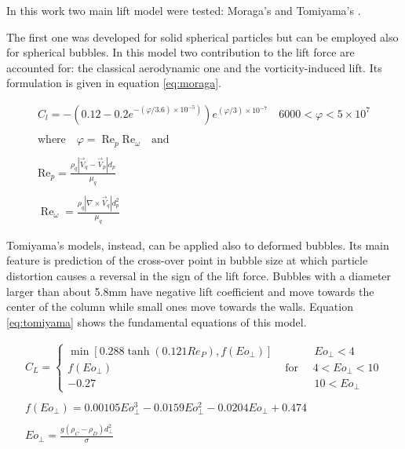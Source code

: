 \documentclass[11pt,a4paper]{article}
\begin{document}
In this work two main lift model were tested: Moraga's \cite{moragalift} and Tomiyama's \cite{tomiyamalift}.

The first one was developed for solid spherical particles but can be employed also for spherical bubbles. In this model two contribution to the lift force are accounted for: the classical aerodynamic one and the vorticity-induced lift. Its formulation is given in equation \ref{eq:moraga}.

\begin{equation}
\begin{array}{l}
C_{l}=-\left(0.12-0.2 e^{\left.-(\varphi / 3.6) \times 10^{-5}\right)}\right) e^{(\varphi / 3) \times 10^{-7}} \quad 6000<\varphi<5 \times 10^{7}\\ \\
\text{where} \quad \varphi=\operatorname{Re}_{p} \mathrm{Re}_{\omega} \quad \text{and}	\\ \\
\mathrm{Re}_{p}=\frac{\rho_{q}\left|\vec{V}_{q}-\vec{V}_{p}\right| d_{p}}{\mu_{q}} \\ \\
\operatorname{Re}_{\omega}=\frac{\rho_{q}\left|\nabla \times \vec{V}_{q}\right| d_{p}^{2}}{\mu_{q}}
\end{array}
\label{eq:moraga}	
\end{equation}

Tomiyama's models, instead, can be applied also to deformed bubbles. Its main feature is prediction of the cross-over point in bubble size at which particle distortion causes a reversal in the sign of the lift force. Bubbles with a diameter larger than about 5.8mm have negative lift coefficient and move towards the center of the column while small ones move towards the walls. Equation \ref{eq:tomiyama} shows the fundamental equations of this model.


\begin{equation}
\begin{array}{l}
C_{L}=\left\{\begin{array}{llr}
\min \left[0.288 \tanh \left(0.121 R e_{P}\right), f\left(E o_{\perp}\right)\right] &  \quad\quad\quad E o_{\perp}< 4 \\
f\left(E o_{\perp}\right) & \text { for } \quad 4<E o_{\perp}<10 \\
-0.27 & \quad\quad\quad 10<E o_{\perp}
\end{array}\right.\\ \\
f\left(E o_{\perp}\right)=0.00105 E o_{\perp}^{3}-0.0159 E o_{\perp}^{2}-0.0204 E o_{\perp}+0.474\\ \\
E o_{\perp}=\frac{g\left(\rho_{C}-\rho_{D}\right) d_{\perp}^{2}}{\sigma}
\end{array}
\label{eq:tomiyama}
\end{equation}
\end{document}
